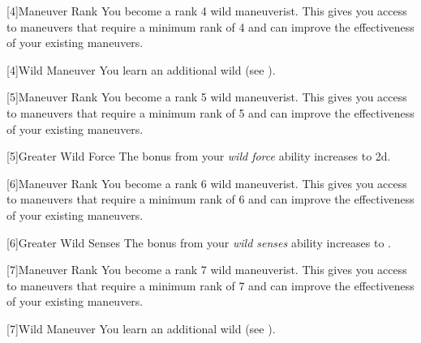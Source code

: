         {
            [4]{Maneuver Rank} You become a rank 4 wild maneuverist.
            This gives you access to maneuvers that require a minimum rank of 4 and can improve the effectiveness of your existing maneuvers.

            [4]{Wild Maneuver}
            You learn an additional wild  (see ).
        }

        {
            [5]{Maneuver Rank} You become a rank 5 wild maneuverist.
            This gives you access to maneuvers that require a minimum rank of 5 and can improve the effectiveness of your existing maneuvers.

            [5]{Greater Wild Force} The bonus from your \textit{wild force} ability increases to \plus2d.
        }

        {
            [6]{Maneuver Rank} You become a rank 6 wild maneuverist.
            This gives you access to maneuvers that require a minimum rank of 6 and can improve the effectiveness of your existing maneuvers.

            [6]{Greater Wild Senses} The bonus from your \textit{wild senses} ability increases to .
        }

        {
            [7]{Maneuver Rank} You become a rank 7 wild maneuverist.
            This gives you access to maneuvers that require a minimum rank of 7 and can improve the effectiveness of your existing maneuvers.

            [7]{Wild Maneuver}
            You learn an additional wild  (see ).
        }



\newpage

